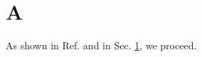 \documentclass{article}
\begin{document}
\section{A}\label{sec:a}
As shown in Ref. \cite{a} and in Sec.
\ref{sec:a}, we proceed.
\end{document}
